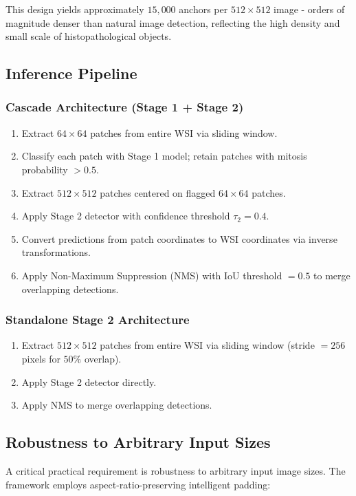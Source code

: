 \documentclass[journal]{IEEEtran}
\begin{document}
This design yields approximately $15,000$ anchors per $512 \times 512$ image - orders of magnitude denser than natural image detection, reflecting the high density and small scale of histopathological objects.

\subsection{Inference Pipeline}

\subsubsection{Cascade Architecture (Stage 1 + Stage 2)}
\begin{enumerate}
\item Extract $64 \times 64$ patches from entire WSI via sliding window.
\item Classify each patch with Stage 1 model; retain patches with mitosis probability $> 0.5$.
\item Extract $512 \times 512$ patches centered on flagged $64 \times 64$ patches.
\item Apply Stage 2 detector with confidence threshold $\tau_2 = 0.4$.
\item Convert predictions from patch coordinates to WSI coordinates via inverse transformations.
\item Apply Non-Maximum Suppression (NMS) with IoU threshold $= 0.5$ to merge overlapping detections.
\end{enumerate}

\subsubsection{Standalone Stage 2 Architecture}
\begin{enumerate}
\item Extract $512 \times 512$ patches from entire WSI via sliding window (stride $= 256$ pixels for $50\%$ overlap).
\item Apply Stage 2 detector directly.
\item Apply NMS to merge overlapping detections.
\end{enumerate}

\subsection{Robustness to Arbitrary Input Sizes}
A critical practical requirement is robustness to arbitrary input image sizes. The framework employs aspect-ratio-preserving intelligent padding:
\end{document}
